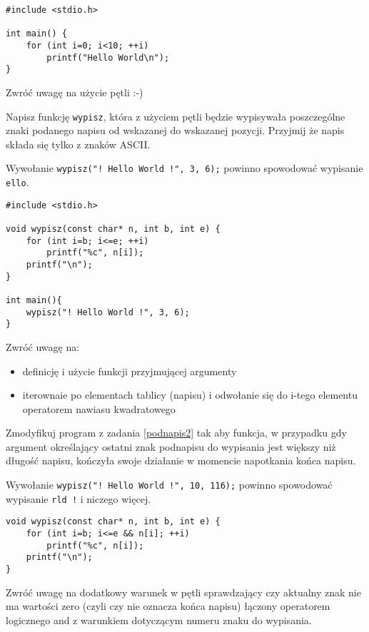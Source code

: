 \dbEntryCheckResults
\begin{verbatim}
#include <stdio.h>

int main() {
	for (int i=0; i<10; ++i)
		printf("Hello World\n");
}
\end{verbatim}

\noindent Zwróć uwagę na użycie pętli :-)
\fi


\dbEntryCheckResults
Napisz funkcję \Verb#wypisz#, która z użyciem pętli będzie wypisywała poszczególne znaki podanego napisu od wskazanej do wskazanej pozycji. Przyjmij że napis składa się tylko z znaków ASCII.

Wywołanie \Verb#wypisz("! Hello World !", 3, 6);# powinno spowodować wypisanie \Verb#ello#.
\fi

\dbEntryCheckResults
\begin{verbatim}
#include <stdio.h>

void wypisz(const char* n, int b, int e) {
	for (int i=b; i<=e; ++i)
		printf("%c", n[i]);
	printf("\n");
}

int main(){
	wypisz("! Hello World !", 3, 6);
}
\end{verbatim}

\noindent Zwróć uwagę na:
\begin{itemize}
\item definicję i użycie funkcji przyjmującej argumenty
\item iterownaie po elementach tablicy (napisu) i odwołanie się do i-tego elementu operatorem nawiasu kwadratowego
\end{itemize}
\fi


\dbEntryCheckResults
Zmodyfikuj program z zadania \ref{podnapis2} tak aby funkcja, w przypadku gdy argument określający ostatni znak podnapisu do wypisania jest większy niż długość napisu, kończyła swoje działanie w momencie napotkania końca napisu.

Wywołanie \Verb#wypisz("! Hello World !", 10, 116);# powinno spowodować wypisanie \Verb#rld !# i niczego więcej.
\fi

\dbEntryCheckResults
\begin{verbatim}
void wypisz(const char* n, int b, int e) {
	for (int i=b; i<=e && n[i]; ++i)
		printf("%c", n[i]);
	printf("\n");
}
\end{verbatim}

\noindent Zwróć uwagę na dodatkowy warunek w pętli sprawdzający czy aktualny znak nie ma wartości zero (czyli czy nie oznacza końca napisu) łączony operatorem logicznego and z warunkiem dotyczącym numeru znaku do wypisania.
\fi


